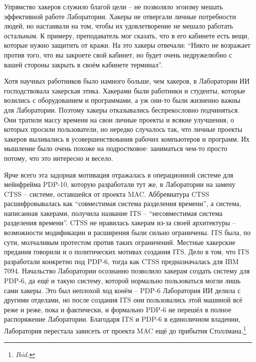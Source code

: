 Упрямство хакеров служило благой цели -- не позволяло эгоизму мешать эффективной работе Лаборатории. Хакеры не отвергали личные потребности людей, но настаивали на том, чтобы их удовлетворение не мешало работать остальным. К примеру, преподаватель мог сказать, что в его кабинете есть вещи, которые нужно защитить от кражи. На это хакеры отвечали: \enquote{Никто не возражает против того, что вы закроете свой кабинет, но будет очень недружелюбно с вашей стороны закрыть в своём кабинете терминал}.

Хотя научных работников было намного больше, чем хакеров, в Лаборатории ИИ господствовала хакерская этика. Хакерами были работники и студенты, которые возились с оборудованием и программами, а уж они-то были жизненно важны для Лаборатории. Поэтому хакеры отказывались беспрекословно подчиняться. Они тратили массу времени на свои личные проекты и всякие улучшения, о которых просили пользователи, но нередко случалось так, что личные проекты хакеров выливались в усовершенствования рабочих компьютеров и программ. Их мышление было очень похоже на подростковое: заниматься чем-то просто потому, что это интересно и весело.

Ярче всего эта задорная мотивация отражалась в операционной системе для мейнфрейма PDP-10, которую разработали тут же, в Лаборатории на замену CTSS -- системе, оставшейся от проекта MAC. Аббревиатура CTSS расшифровывалась как \enquote{совместимая система разделения времени}, а система, написанная хакерами, получила название ITS -- \enquote{несовместимая система разделения времени}. CTSS не нравилась хакерам из-за своей архитектуры -- возможности модификации и расширения были сильно ограничены. ITS была, по сути, молчаливым протестом против таких ограничений. Местные хакерские предания говорили и о политических мотивах создания ITS. Дело в том, что ITS разработали конкретно под PDP-6, тогда как CTSS предназначалась для IBM 7094. Начальство Лаборатории осознанно позволило хакерам создать систему для PDP-6, да ещё и такую систему, которой нормально пользоваться могли лишь сами хакеры. Это был неплохой ход конём -- PDP-6 Лаборатория ИИ делила с другими отделами, но после создания ITS они пользовались этой машиной всё реже и реже, пока и фактически, и формально PDP-6 не перешёл в полное распоряжение Лаборатории. Благодаря ITS и PDP-6 в единоличном владении, Лаборатория перестала зависеть от проекта MAC ещё до прибытия Столлмана.\footnote{\textit{Ibid.}}

